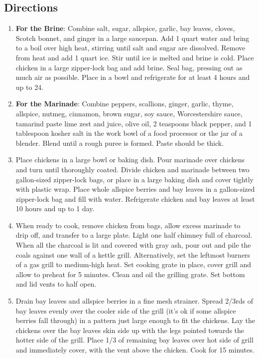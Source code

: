 \documentclass[]{article}
\providecommand{\tightlist}{%
  \setlength{\itemsep}{0pt}\setlength{\parskip}{0pt}}
\begin{document}
\hypertarget{directions}{%
\subsection{Directions}\label{directions}}

\begin{enumerate}
\def\labelenumi{\arabic{enumi}.}
\setcounter{enumi}{-1}
\tightlist
\item
  \textbf{For the Brine}: Combine salt, sugar, allspice, garlic, bay leaves, cloves, Scotch bonnet, and ginger in a large saucepan. Add 1 quart water and bring to a boil over high heat, stirring until salt and sugar are dissolved. Remove from heat and add 1 quart ice. Stir until ice is melted and brine is cold. Place chicken in a large zipper-lock bag and add brine. Seal bag, pressing out as much air as possible. Place in a bowl and refrigerate for at least 4 hours and up to 24.
\item
  \textbf{For the Marinade}: Combine peppers, scallions, ginger, garlic, thyme, allspice, nutmeg, cinnamon, brown sugar, soy sauce, Worcestershire sauce, tamarind paste lime zest and juice, olive oil, 2 teaspoons black pepper, and 1 tablespoon kosher salt in the work bowl of a food processor or the jar of a blender. Blend until a rough puree is formed. Paste should be thick.
\item
  Place chickens in a large bowl or baking dish. Pour marinade over chickens and turn until thoroughly coated. Divide chicken and marinade between two gallon-sized zipper-lock bags, or place in a large baking dish and cover tightly with plastic wrap. Place whole allspice berries and bay leaves in a gallon-sized zipper-lock bag and fill with water. Refrigerate chicken and bay leaves at least 10 hours and up to 1 day.
\item
  When ready to cook, remove chicken from bags, allow excess marinade to drip off, and transfer to a large plate. Light one half chimney full of charcoal. When all the charcoal is lit and covered with gray ash, pour out and pile the coals against one wall of a kettle grill. Alternatively, set the leftmost burners of a gas grill to medium-high heat. Set cooking grate in place, cover grill and allow to preheat for 5 minutes. Clean and oil the grilling grate. Set bottom and lid vents to half open.
\item
  Drain bay leaves and allspice berries in a fine mesh strainer. Spread 2/3rds of bay leaves evenly over the cooler side of the grill (it's ok if some allspice berries fall through) in a pattern just large enough to fit the chickens. Lay the chickens over the bay leaves skin side up with the legs pointed towards the hotter side of the grill. Place 1/3 of remaining bay leaves over hot side of grill and immediately cover, with the vent above the chicken. Cook for 15 minutes.

\end{enumerate}
\end{document}

